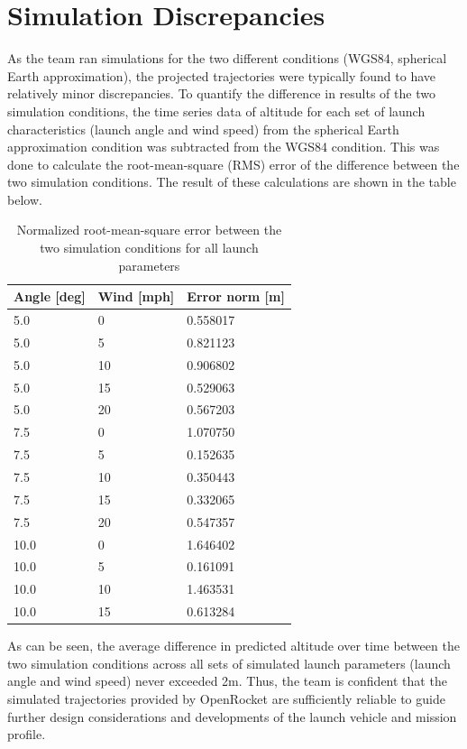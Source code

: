 \section{Simulation Discrepancies}
As the team ran simulations for the two different conditions (WGS84, spherical Earth approximation), the projected trajectories were typically found to have relatively minor discrepancies. To quantify the difference in results of the two simulation conditions, the time series data of altitude for each set of launch characteristics (launch angle and wind speed) from the spherical Earth approximation condition was subtracted from the WGS84 condition. This was done to calculate the root-mean-square (RMS) error of the difference between the two simulation conditions. The result of these calculations are shown in the table below.
\begin{table}[H]
\centering
\caption{Normalized root-mean-square error between the two simulation conditions for all launch parameters}
\label{tab:FlightDynamics:AverageError}
\begin{tabularx}{.5\linewidth}{llX}
\toprule
 \textbf{Angle [deg]} &  \textbf{Wind [mph]} &  \textbf{Error norm [m]} \\
\midrule
   5.0 &     0 &    0.558017 \\
   5.0 &     5 &    0.821123 \\
   5.0 &    10 &    0.906802 \\
   5.0 &    15 &    0.529063 \\
   5.0 &    20 &    0.567203 \\
   7.5 &     0 &    1.070750 \\
   7.5 &     5 &    0.152635 \\
   7.5 &    10 &    0.350443 \\
   7.5 &    15 &    0.332065 \\
   7.5 &    20 &    0.547357 \\
  10.0 &     0 &    1.646402 \\
  10.0 &     5 &    0.161091 \\
  10.0 &    10 &    1.463531 \\
  10.0 &    15 &    0.613284 \\
\bottomrule
\end{tabularx}
\end{table}
As can be seen, the average difference in predicted altitude over time between the two simulation conditions across all sets of simulated launch parameters (launch angle and wind speed) never exceeded 2m. Thus, the team is confident that the simulated trajectories provided by OpenRocket are sufficiently reliable to guide further design considerations and developments of the launch vehicle and mission profile. 